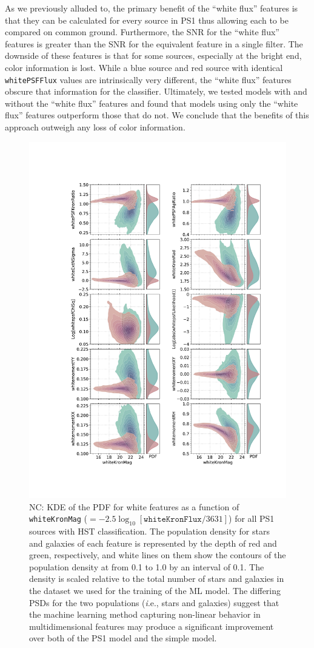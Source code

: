 \documentclass[twocolumn]{aastex62}
\newcommand{\NC}[1]{{\color{brown} NC: {#1}}}
\begin{document}
As we previously alluded to, the primary benefit of the ``white flux'' features is that they can be calculated for every source in PS1 thus allowing each to be compared on common ground. Furthermore, the SNR for the ``white flux'' features is greater than the SNR for the equivalent feature in a single filter. The downside of these features is that for some sources, especially at the bright end, color information is lost. While a blue source and red source with identical \texttt{whitePSFFlux} values are intrinsically very different, the ``white flux'' features obscure that information for the classifier. Ultimately, we tested models with and without the ``white flux'' features and found that models using only the ``white flux'' features outperform those that do not. We conclude that the benefits of this approach outweigh any loss of color information. 

\begin{figure}[t]
 \centering
  \includegraphics[width=3.5in
  ]{./Figures/whiteFeatures.pdf}
  \caption{
  \NC{KDE of the PDF for white features as a function of \texttt{whiteKronMag}
  ($=-2.5\log_{10}[\mathtt{whiteKronFlux}/3631]$) 
  for all PS1 sources with HST classification. 
  The population density for stars and galaxies of each feature is represented by the depth of red and green, respectively, 
  and white lines on them show the contours of the population density at from 0.1 to 1.0 by an interval of 0.1.
  The density is scaled relative to the total number of stars and galaxies in the dataset we used for the training of the ML model. 
  The differing PSDs for the two populations ({\textit i.e.,} stars and galaxies) suggest that 
  the machine learning method capturing non-linear behavior in multidimensional features 
  may produce a significant improvement over both of the PS1 model and the simple model. }
  }
  \label{fig:features}
\end{figure}
\end{document}

